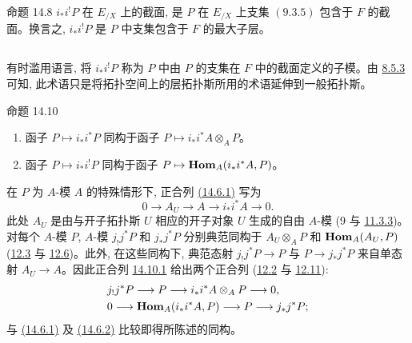 \begin{enonce*}{命题 14.8}
$i_{\ast}i^{!}P$ 在 $E_{/X}$ 上的\pageoriginale 截面, 是 $P$ 在 $E_{/X}$ 上支集 $(\hyperref[IV.subsubsec9.3.5]{9.3.5})$ 包含于 $F$ 的截面。换言之, $i_{\ast}i^{!}P$ 是 $P$ 中支集包含于 $F$ 的最大子层。
\end{enonce*}

\setcounter{subsection}{8}
\subsection{}
有时滥用语言, 将 $i_{\ast}i^{!}P$ 称为 $P$ 中由 $P$ 的支集在 $F$ 中的截面定义的子模。由 \hyperref[IV.rem8.5.3]{8.5.3} 可知, 此术语只是将拓扑空间上的层拓扑斯所用的术语延伸到一般拓扑斯。

\begin{enonce*}{命题 14.10}
\begin{enumerate}
\renewcommand{\labelenumi}{\theenumi)}
\item 函子 $P\mapsto i_{\ast}i^{\ast}P$ 同构于函子 $P\mapsto i_{\ast}i^{\ast}A\otimes_A P$。

\item 函子 $P\mapsto i_{\ast}i^{!}P$ 同构于函子 $P\mapsto\operatorname{\mathbf{Hom}}_A(i_{\ast}i^{\ast}A,P)$。
\end{enumerate}
\end{enonce*}

在 $P$ 为 $A$-模 $A$ 的特殊情形下, 正合列 \hyperlink{sga4.exp.IV.equation.14.6.1}{(14.6.1)} 写为
\begin{equation*}
0\longrightarrow A_U\longrightarrow A\longrightarrow
i_{\ast}i^{\ast}A\longrightarrow 0.\tag{14.10.1}
\end{equation*}
此处 $A_U$ 是由与开子拓扑斯 $U$ 相应的开子对象 $U$ 生成的自由 $A$-模 (9 与 \hyperref[IV.prop11.3.3]{11.3.3})。对每个 $A$-模 $P$, $A$-模 $j_{!}j^{\ast}P$ 和 $j_{\ast}j^{\ast}P$ 分别典范同构于 $A_U\otimes_A P$ 和 $\operatorname{\mathbf{Hom}}_A(A_U,P)$ (\hyperref[IV.prop12.3]{12.3} 与 \hyperref[IV.cor12.6]{12.6})。此外, 在这些同构下, 典范态射 $j_{!}j^{\ast}P\rightarrow P$ 与 $P\rightarrow j_{\ast}j^{\ast}P$ 来自单态射 $A_U\rightarrow A$。因此正合列 \hyperref[IV.eq14.10.1]{14.10.1} 给出两个正合列 (\hyperref[IV.subsec12.2]{12.2} 与 \hyperref[IV.prop12.11]{12.11}):
\begin{align*}
& j_{!}j^{\ast}P\longrightarrow P\longrightarrow
i_{\ast}i^{\ast}A\otimes_AP\longrightarrow 0{},\\
& 0\longrightarrow \operatorname{\mathbf{Hom}}_A(i_{\ast}i^{\ast}A,P)\longrightarrow
P\longrightarrow j_{\ast}j^{\ast}P{};
\end{align*}
与 \hyperlink{sga4.exp.IV.equation.14.6.1}{(14.6.1)} 及 \hyperlink{sga4.exp.IV.equation.14.6.2}{(14.6.2)} 比较即得所陈述的同构。


